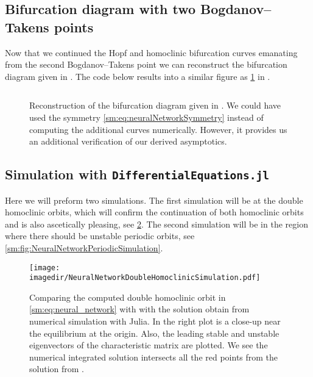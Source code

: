 \subsection{Bifurcation diagram with two Bogdanov--Takens points}
\label{sm:sec:neural_network_model:bifurcation_diagramII}
Now that we continued the Hopf and homoclinic bifurcation curves emanating from
the second Bogdanov--Takens point we can reconstruct the bifurcation diagram
given in \cite[Figure 7]{giannakopoulos2001bifurcations}. The code below
results into a similar figure as \cref{sm:fig:NeuralNetworkCompareParametersII} in \MATLAB.
\inputminted[firstline=218, lastline=245]{MATLAB}{\pathToDDEBifToolDemos/neural_network_model/neural_network_model.m}
\begin{figure}[ht]
    \centering
    \caption{Reconstruction of the bifurcation diagram given in \cite[Figure
        7]{giannakopoulos2001bifurcations}. We could have used the symmetry
        \cref{sm:eq:neuralNetworkSymmetry} instead of computing the additional
        curves numerically. However, it provides us an additional verification of
        our derived asymptotics.}
    \label{sm:fig:NeuralNetworkCompareParametersII}
\end{figure}

\subsection{Simulation with {\tt DifferentialEquations.jl}}
Here we will preform two simulations. The first simulation will be at the
double homoclinic orbits, which will confirm the continuation of both
homoclinic orbits and is also ascetically pleasing, see \cref{sm:fig:NeuralNetworkSimulationHomoclinic}. The second simulation will
be in the region where there should be unstable periodic orbits, see \cref{sm:fig:NeuralNetworkPeriodicSimulation}.

\begin{figure}[ht]
    \texttt{[image: \\imagedir/NeuralNetworkDoubleHomoclinicSimulation.pdf]}
    \caption{Comparing the computed double homoclinic orbit in \cref{sm:eq:neural_network}
    with \DDEBIFTOOL with the solution obtain from numerical simulation with Julia.
    In the right plot is a close-up near the equilibrium at the origin. Also, the
    leading stable and unstable eigenvectors of the characteristic matrix are plotted. We see the numerical integrated solution
    intersects all the red points from the solution from \DDEBIFTOOL.}
    \label{sm:fig:NeuralNetworkSimulationHomoclinic}
\end{figure}

